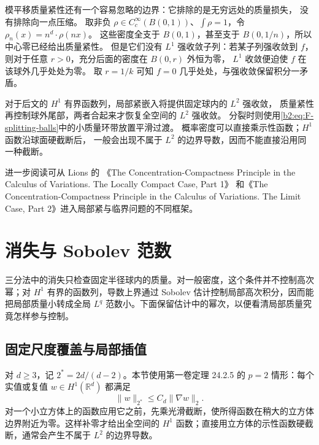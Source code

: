 模平移质量紧性还有一个容易忽略的边界：它排除的是无穷远处的质量损失，
没有排除向一点压缩。
取非负 \(\rho\in C_c^\infty(B(0,1))\)、\(\int\rho=1\)，令
\(\rho_n(x)=n^d\cdot\rho(nx)\)。
这些密度全支于 \(B(0,1)\)，甚至支于 \(B(0,1/n)\)，所以中心零已经给出质量紧性。
但是它们没有 \(L^1\) 强收敛子列：若某子列强收敛到 \(f\)，
则对于任意 \(r>0\)，充分后面的密度在 \(B(0,r)\) 外恒为零，
\(L^1\) 收敛便迫使 \(f\) 在该球外几乎处处为零。
取 \(r=1/k\) 可知 \(f=0\) 几乎处处，与强收敛保留积分一矛盾。

\ProseParagraphBreak
对于后文的 \(H^1\) 有界函数列，局部紧嵌入将提供固定球内的 \(L^2\) 强收敛，
质量紧性再控制球外尾部，两者合起来才恢复全空间的 \(L^2\) 强收敛。
分裂时则使用\eqref{b2:eq:F-splitting-balls}中的小质量环带放置平滑过渡。
概率密度可以直接乘示性函数；\(H^1\) 函数沿球面硬截断后，
一般会出现不属于 \(L^2\) 的边界导数，因而不能直接沿用同一种截断。

\ProseParagraphBreak
进一步阅读可从 Lions 的
《The Concentration-Compactness Principle in the Calculus of Variations. The Locally Compact Case, Part 1》\cite{Lions1984Concentration}
和《The Concentration-Compactness Principle in the Calculus of Variations. The Limit Case, Part 2》\cite{Lions1985Concentration}进入局部紧与临界问题的不同框架。

\section{消失与 Sobolev 范数}

\label{b2:sec:app-F-3}

三分法中的消失只检查固定半径球内的质量。对一般密度，这个条件并不控制高次幂；对 \(H^1\) 有界的函数列，导数上界通过 Sobolev 估计控制局部高次积分，因而能把局部质量小转成全局 \(L^q\) 范数小。下面保留估计中的幂次，以便看清局部质量究竟怎样参与控制。

\subsection{固定尺度覆盖与局部插值}

\label{b2:subsec:F-fixed-scale}

对 \(d\ge3\)，记 \(2^*=2d/(d-2)\)。本节使用第一卷定理 24.2.5 的 \(p=2\) 情形：每个实值或复值 \(w\in H^1(\mathbb R^d)\) 都满足
\[
 \|w\|_{2^*}\le C_d\|\nabla w\|_2.
\]
对一个小立方体上的函数应用它之前，先乘光滑截断，使所得函数在稍大的立方体边界附近为零。这样补零才给出全空间的 \(H^1\) 函数；直接用立方体的示性函数硬截断，通常会产生不属于 \(L^2\) 的边界导数。

